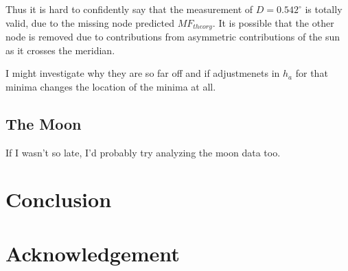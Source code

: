 \documentclass[12pt]{article}
\begin{document}
Thus it is hard to confidently say that the measurement of $D = 0.542^\circ$ is totally valid, due to the missing node predicted $MF_{theory}$. It is possible that the other node is removed due to contributions from asymmetric contributions of the sun as it crosses the meridian.

I might investigate why they are so far off and if adjustmenets in $h_a$ for that minima changes the location of the minima at all. 

\subsection{The Moon}
If I wasn't so late, I'd probably try analyzing the moon data too.

\section{Conclusion}


\section{Acknowledgement}
\end{document}

